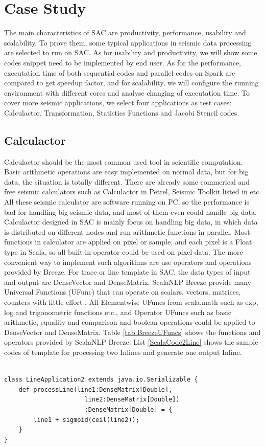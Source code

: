 \section{Case Study}
The main characteristics of SAC are productivity, performance, usability and scalability. To prove them, some typical applications in seismic data processing are selected to run on SAC. As for usability and productivity, we will show some codes snippet need to be implemented by end user. As for the performance, executation time of both sequential codes and parallel codes on Spark are compared to get speedup factor, and for scalability, we will configure the running environment with different cores and analyse changing of executation time. To cover more seismic applications, we select four applications as test cases: Calculactor, Transformation, Statistics Functions and Jacobi Stencil codes.

\subsection{Calculactor}
Calculactor should be the most common used tool in scientific computation. Basic arithmetic operations are easy implemented on normal data, but for big data, the situation is totally different. There are already some commerical and free seismic calculators such as Calculactor in Petrel, Seismic Toolkit listed in \cite{SeismicCalculator} etc. All these seismic calculator are software running on PC, so the performance is bad for handling big seismic data, and most of them even could handle big data. Calculactor designed in SAC is mainly focus on handling big data, in which data is distributed on different nodes and run arithmetic functions in parallel. Most functions in calculator are applied on pixel or sample, and each pixel is a Float type in Scala, so all built-in operator could be used on pixel data. The more convenient way to implement such algorithms are use operators and operations provided by Breeze. For trace or line template in SAC, the data types of input and output are DenseVector and DenseMatrix. ScalaNLP Breeze provide many Universal Functions (UFunc) that can operate on scalars, vectors, matrices, counters with little effort \cite{BreezeUFunc}. All Elementwise UFuncs from scala.math such as exp, log and trigonometric functions etc., and Operator UFuncs such as basic arithmetic, equality and comparison and boolean operations could be applied to DenseVector and DenseMatrix. Table \ref{tab:BreezeUFuncs} shows the functions and operators provided by ScalaNLP Breeze. List \ref{ScalaCode2Line} shows the sample codes of template for processing two Inlines and generate one output Inline.  
\lstset{language=Java,frame=single}
\begin{lstlisting}[float,caption=Sample codes of arighmetic operations on two datasets,label=ScalaCode2Line]

class LineApplication2 extends java.io.Serializable {
    def processLine(line1:DenseMatrix[Double],
                      line2:DenseMatrix[Double])
                      :DenseMatrix[Double] = {
        line1 + sigmoid(ceil(line2)); 
    }
}

\end{lstlisting}

